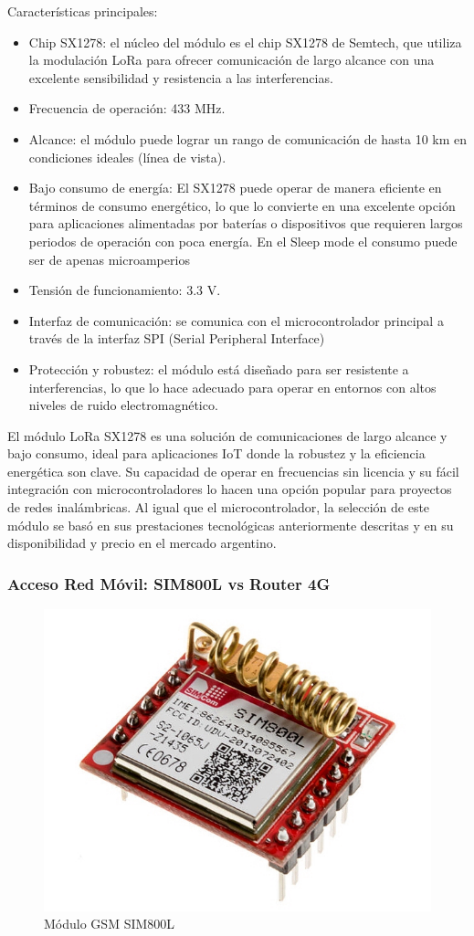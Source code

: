 Características principales:
\begin{itemize}
    \item Chip SX1278: el núcleo del módulo es el chip SX1278 de Semtech, que utiliza la modulación LoRa para ofrecer comunicación de largo alcance con una excelente sensibilidad y resistencia a las interferencias.
    \item Frecuencia de operación: 433 MHz.
    \item Alcance: el módulo puede lograr un rango de comunicación de hasta 10 km en condiciones ideales (línea de vista).
    \item Bajo consumo de energía: El SX1278 puede operar de manera eficiente en términos de consumo energético, lo que lo convierte en una excelente opción para aplicaciones alimentadas por baterías o dispositivos que requieren largos periodos de operación con poca energía. En el Sleep mode el consumo puede ser de apenas microamperios
    \item Tensión de funcionamiento: 3.3 V.
    \item Interfaz de comunicación: se comunica con el microcontrolador principal a través de la interfaz SPI (Serial Peripheral Interface)
    \item Protección y robustez: el módulo está diseñado para ser resistente a interferencias, lo que lo hace adecuado para operar en entornos con altos niveles de ruido electromagnético.
\end{itemize}

El módulo LoRa SX1278 es una solución de comunicaciones de largo alcance y bajo consumo, ideal para aplicaciones IoT donde la robustez y la eficiencia energética son clave. Su capacidad de operar en frecuencias sin licencia y su fácil integración con microcontroladores lo hacen una opción popular para proyectos de redes inalámbricas. Al igual que el microcontrolador, la selección de este módulo se basó en sus prestaciones tecnológicas anteriormente descritas y en su disponibilidad y precio en el mercado argentino.

\subsubsection{Acceso Red Móvil: SIM800L vs Router 4G}

\begin{figure}[H]
    \centering
    \includegraphics[width=0.5\linewidth]{Figures//Hardware//Modulos/1-SIM800L-Module.jpg}
    \caption{Módulo GSM SIM800L}
    \label{fig:enter-label}
\end{figure}

